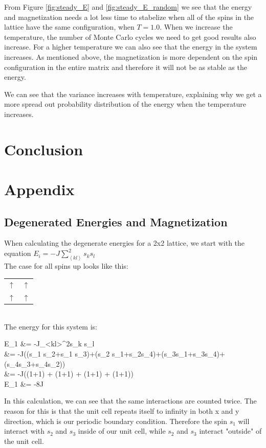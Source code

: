 \documentclass{article}
\begin{document}
{{	%
	From Figure \ref{fig:steady_E} and \ref{fig:steady_E_random} we see that the energy and magnetization needs a lot less time to stabelize when all of the spins in the lattice have the same configuration, when $T = 1.0$. When we increase the temperature, the number of Monte Carlo cycles we need to get good results also increase. For a higher temperature we can also see that the energy in the system increases. As mentioned above, the magnetization is more dependent on the spin configuration in the entire matrix and therefore it will not be as stable as the energy.


	We can see that the variance increases with temperature, explaining why we get a more spread out probability distribution of the energy when the temperature increases.

\section{Conclusion}


\section{Appendix}
	\subsection{Degenerated Energies and Magnetization}

		When calculating the degenerate energies for a 2x2 lattice, we start with the equation $E_i=-J\sum\limits_{\left<kl\right>}^{2}s_ks_l$\\
		The case for all spins up looks like this:
		\begin{tabular}{c c}
			$\uparrow$ & $\uparrow$\\
			$\uparrow$ & $\uparrow$
		\end{tabular}\\

		The energy for this system is:
		\begin{flalign*}
			E_1 &= -J\sum\limits_{<kl>}^{2}s_k s_l\\
			&= -J((s_1 s_2+s_1 s_3)+(s_2 s_1+s_2s_4)+(s_3s_1+s_3s_4)+(s_4s_3+s_4s_2))\\
			&= -J((1+1) + (1+1) + (1+1) + (1+1))\\
			E_1 &= -8J
		\end{flalign*}
		In this calculation, we can see that the same interactions are counted twice. The reason for this is that the unit cell repeats itself to infinity in both x and y direction, which is our periodic boundary condition. Therefore the spin $s_1$ will interact with $s_2$ and $s_3$ inside of our unit cell, while $s_2$ and $s_3$ interact "outside" of the unit cell.

}}
\end{document}
